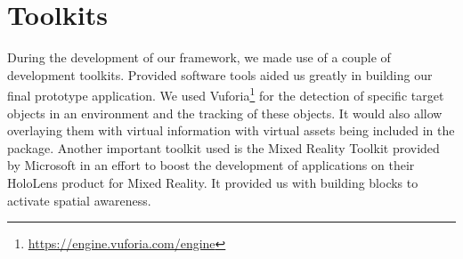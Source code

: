 

\section{Toolkits}
During the development of our framework, we made use of a couple of development toolkits. Provided software tools aided us greatly in building our final prototype application. We used Vuforia\footnote{\protect\url{https://engine.vuforia.com/engine}} for the detection of specific target objects in an environment and the tracking of these objects. It would also allow overlaying them with virtual information with virtual assets being included in the package. Another important toolkit used is the Mixed Reality Toolkit provided by Microsoft in an effort to boost the development of applications on their HoloLens product for Mixed Reality. It provided us with building blocks to activate spatial awareness.

